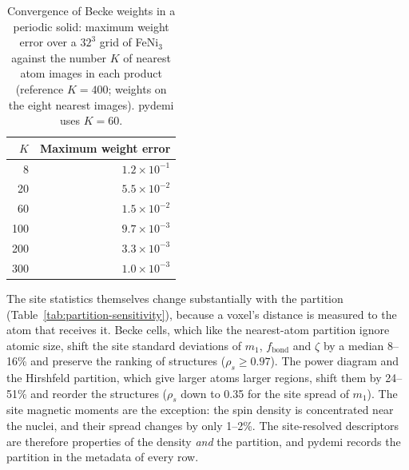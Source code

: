 \documentclass[11pt,a4paper]{article}
\begin{document}
\begin{table}[htbp]
\centering
\caption{Convergence of Becke weights in a periodic solid: maximum weight error
over a $32^3$ grid of FeNi$_3$ against the number $K$ of nearest atom images in
each product (reference $K=400$; weights on the eight nearest images). pydemi
uses $K=60$.}
\label{tab:partitions}
\begin{tabular}{rr}
\toprule
$K$ & Maximum weight error \\
\midrule
8 & $1.2\times10^{-1}$ \\
20 & $5.5\times10^{-2}$ \\
60 & $1.5\times10^{-2}$ \\
100 & $9.7\times10^{-3}$ \\
200 & $3.3\times10^{-3}$ \\
300 & $1.0\times10^{-3}$ \\
\bottomrule
\end{tabular}
\end{table}

The site statistics themselves change substantially with the partition
(Table~\ref{tab:partition-sensitivity}), because a voxel's distance is measured
to the atom that receives it. Becke cells, which like the nearest-atom
partition ignore atomic size, shift the site standard deviations of $m_1$,
$f_{\mathrm{bond}}$ and $\zeta$ by a median 8--16\% and preserve the ranking of
structures ($\rho_s \geq 0.97$). The power diagram and the Hirshfeld partition,
which give larger atoms larger regions, shift them by 24--51\% and reorder the
structures ($\rho_s$ down to 0.35 for the site spread of $m_1$). The site
magnetic moments are the exception: the spin density is concentrated near the
nuclei, and their spread changes by only 1--2\%. The site-resolved descriptors
are therefore properties of the density \emph{and} the partition, and pydemi
records the partition in the metadata of every row.
\end{document}
